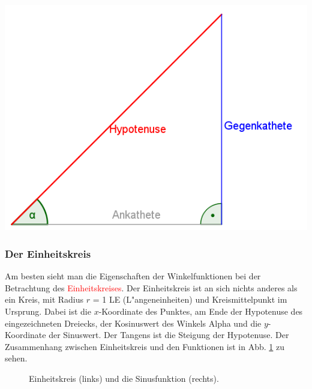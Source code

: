 \begin{minipage}{0.45\textwidth}
\includegraphics[width=1.0\textwidth]{pictures/TrigonDreieck}
\end{minipage}

\subsubsection{Der Einheitskreis}
Am besten sieht man die Eigenschaften der Winkelfunktionen bei der Betrachtung des \textcolor{red}{Einheitskreises}. Der Einheitskreis ist an sich nichts anderes als ein Kreis, mit Radius $r$ = 1 LE (L"angeneinheiten) und Kreismittelpunkt im Ursprung. Dabei ist die $x$-Koordinate des Punktes, am Ende der Hypotenuse des eingezeichneten Dreiecks, der Kosinuswert des Winkels Alpha und die $y$-Koordinate der Sinuswert. Der Tangens ist die Steigung der Hypotenuse. Der Zusammenhang zwischen Einheitskreis und den Funktionen ist in Abb. \ref{fig:circ} zu sehen.

\begin{figure}[h!]

\caption{Einheitskreis (links) und die Sinusfunktion (rechts).}
\label{fig:circ}
\end{figure}


